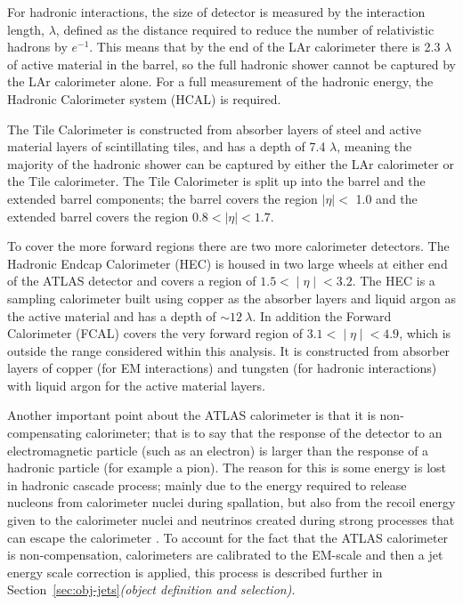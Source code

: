 For hadronic interactions, the size of detector is measured by the interaction length, $\lambda$,
defined as the distance required to reduce the number of relativistic hadrons by $e^{-1}$.
This means that by the end of the LAr calorimeter there is 2.3 $\lambda$ of active material in the barrel,
so the full hadronic shower cannot be captured by the LAr calorimeter alone.
For a full measurement of the hadronic energy, the Hadronic Calorimeter system (HCAL) is required. 

The Tile Calorimeter is constructed from absorber layers of steel and active material layers of scintillating tiles,
and has a depth of 7.4 $\lambda$, meaning the majority of the hadronic shower can be captured by either the LAr calorimeter or the Tile calorimeter.
The Tile Calorimeter is split up into the barrel and the extended barrel components;
the barrel covers the region $|\eta| <$ 1.0 and the extended barrel covers the region $0.8 < |\eta| < 1.7$. 

To cover the more forward regions there are two more calorimeter detectors.
The Hadronic Endcap Calorimeter (HEC) is housed in two large wheels at either end of the ATLAS detector
and covers a region of $1.5 < ∣\eta∣ < 3.2$.
The HEC is a sampling calorimeter built using copper as the absorber layers and liquid argon as the active material
and has a depth of $\sim 12~\lambda$.
In addition the Forward Calorimeter (FCAL) covers the very forward region of $3.1 < ∣\eta∣ < 4.9$,
which is outside the range considered within this analysis.
It is constructed from absorber layers of
copper (for EM interactions)
and tungsten (for hadronic interactions)
with liquid argon for the active material layers. 

Another important point about the ATLAS calorimeter is that it is non-compensating calorimeter;
that is to say that the response of the detector to an electromagnetic particle (such as an electron)
is larger than the response of a hadronic particle (for example a pion).
The reason for this is some energy is lost in hadronic cascade process;
mainly due to the energy required to release nucleons from calorimeter nuclei during spallation,
but also from the recoil energy given to the calorimeter nuclei
and neutrinos created during strong processes that can escape the calorimeter \cite{det-comp_calo, det-thesis_lene}.
To account for the fact that the ATLAS calorimeter is non-compensation,
calorimeters are calibrated to the EM-scale
and then a jet energy scale correction is applied,
this process is described further in Section~\ref{sec:obj-jets}\textit{(object definition and selection)}. 

